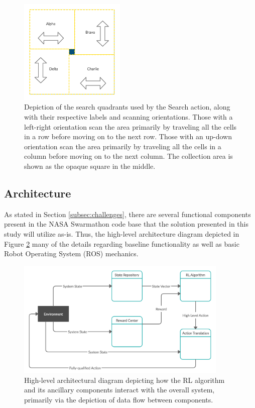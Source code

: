 \documentclass[sigconf,authordraft]{acmart}
\begin{document}
\begin{figure}[ht!]
  \centering
  \includegraphics[width=0.45\textwidth]{images/search_quads.png}
  \caption{Depiction of the search quadrants used by the Search action, along with their respective labels and scanning orientations. Those with a left-right orientation scan the area primarily by traveling all the cells in a row before moving on to the next row. Those with an up-down orientation scan the area primarily by traveling all the cells in a column before moving on to the next column. The collection area is shown as the opaque square in the middle.}
  \label{fig:search_quads}
\end{figure}

\subsection{Architecture}\label{subsec:architecture}
As stated in Section \ref{subsec:challenges}, there are several functional components present in the NASA Swarmathon code base that the solution presented in this study will utilize as-is. Thus, the high-level architecture diagram depicted in Figure \ref{fig:architecture} many of the details regarding baseline functionality as well as basic Robot Operating System (ROS) mechanics.

\begin{figure}[ht!]
  \centering
  \includegraphics[width=0.9\textwidth]{images/architecture.png}
  \caption{High-level architectural diagram depicting how the RL algorithm and its ancillary components interact with the overall system, primarily via the depiction of data flow between components.}
  \label{fig:architecture}
\end{figure}
\end{document}
